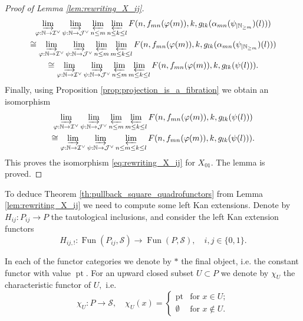\documentclass[11pt,leqno]{amsart}
\numberwithin{equation}{section}
\def\N{\mathbb{N}}
\newcommand{\indlim}[1][]{\mathop{\varinjlim}\limits_{#1}}
\newcommand{\prolim}[1][]{\mathop{\varprojlim}\limits_{#1}}
\newcommand{\cJ}{{\mathcal J}}
\newcommand{\cI}{{\mathcal I}}
\newcommand{\cS}{{\mathcal S}}
\newcommand{\Fun}{\operatorname{Fun}}
\newcommand{\pt}{\operatorname{pt}}
\begin{document}
\begin{proof}[Proof of Lemma \ref{lem:rewriting_X_ij}]
\begin{multline*}
\indlim[\varphi:\N\to\cI^{\vee}]\indlim[\psi:\N\to\cJ^{\vee}]\prolim[n\leq m]\prolim[n\leq k\leq l]F(n,f_{mn}(\varphi(m)),k,g_{lk}(\alpha_{mn}(\psi_{\mid \N_{\geq m}})(l)))\\
\cong \indlim[\varphi:\N\to\cI^{\vee}]\indlim[\psi:\N\to\cJ^{\vee}]\prolim[n\leq m]\prolim[m\leq k\leq l]F(n,f_{mn}(\varphi(m)),k,g_{lk}(\alpha_{mn}(\psi_{\mid \N_{\geq m}})(l)))\\
\cong \indlim[\varphi:\N\to\cI^{\vee}]\indlim[\psi:\N\to\cJ^{\vee}]\prolim[n\leq m]\prolim[m\leq k\leq l]F(n,f_{mn}(\varphi(m)),k,g_{lk}(\psi(l))).
\end{multline*}
Finally, using Proposition \ref{prop:projection_is_a_fibration} we obtain an isomorphism
\begin{multline*}
\indlim[\varphi:\N\to\cI^{\vee}]\indlim[\psi:\N\to\cJ^{\vee}]\prolim[n\leq m]\prolim[m\leq k\leq l]F(n,f_{mn}(\varphi(m)),k,g_{lk}(\psi(l)))\\
\cong \indlim[\varphi:\N\to\cI^{\vee}]\indlim[\psi:\N\to\cJ^{\vee}]\prolim[n\leq m\leq k\leq l]F(n,f_{mn}(\varphi(m)),k,g_{lk}(\psi(l))).
\end{multline*}
This proves the isomorphism \eqref{eq:rewriting_X_ij} for $X_{01}.$ The lemma is proved.
\end{proof}

To deduce Theorem \ref{th:pullback_square_quadrofunctors} from Lemma \ref{lem:rewriting_X_ij} we need to compute some left Kan extensions. Denote by $H_{ij}:P_{ij}\to P$ the tautological inclusions, and consider the left Kan extension functors 
\begin{equation*}
H_{ij,!}:\Fun(P_{ij},\cS)\to \Fun(P,\cS),\quad i,j\in \{0,1\}. 
\end{equation*}

In each of the functor categories we denote by $\ast$ the final object, i.e. the constant functor with value $\pt.$ For an upward closed subset $U\subset P$ we denote by $\chi_U$ the characteristic functor of $U,$ i.e. 
\begin{equation*}
\chi_U:P\to\cS,\quad \chi_U(x)=\begin{cases}
\pt & \text{for }x\in U;\\
\emptyset & \text{for }x\not\in U.
\end{cases}
\end{equation*}
\end{document}
